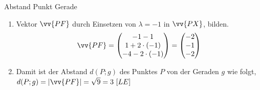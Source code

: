 \begin{bsp}{Abstand Punkt Gerade}{}
\begin{enumerate}
        \item Vektor \(\vv{PF}\) durch Einsetzen von \(\lambda =-1\) in \(\vv{PX}\), bilden.\[\vv{PF} = \begin{pmatrix}
            -1-1\\1+2\cdot (-1)\\-4-2\cdot (-1)
        \end{pmatrix} = \begin{pmatrix}
            -2\\-1\\-2
        \end{pmatrix}\] 
        \item Damit ist der Abstand \(d(P;g)\)  des Punktes \(P\) von der Geraden \(g\) wie folgt, \(d(P;g) = |\vv{PF}| = \sqrt{9} = 3\ [LE]\)
    \end{enumerate}
    \end{bsp}
